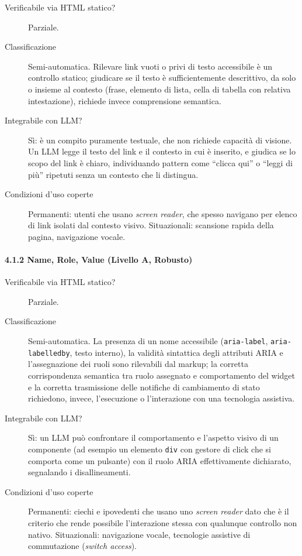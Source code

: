 \begin{description}

\item[Verificabile via HTML statico?] Parziale.

\item[Classificazione] Semi-automatica. Rilevare link vuoti o privi di testo accessibile è un controllo statico; giudicare se il testo è sufficientemente descrittivo, da solo o insieme al contesto (frase, elemento di lista, cella di tabella con relativa intestazione), richiede invece comprensione semantica.

\item[Integrabile con LLM?] Sì: è un compito puramente testuale, che non richiede capacità di visione. Un LLM legge il testo del link e il contesto in cui è inserito, e giudica se lo scopo del link è chiaro, individuando pattern come \enquote{clicca qui} o \enquote{leggi di più} ripetuti senza un contesto che li distingua.

\item[Condizioni d'uso coperte] Permanenti: utenti che usano \emph{screen reader}, che spesso navigano per elenco di link isolati dal contesto visivo. Situazionali: scansione rapida della pagina, navigazione vocale.

\end{description}

\paragraph*{4.1.2 Name, Role, Value (Livello A, Robusto)}

\begin{description}

\item[Verificabile via HTML statico?] Parziale.

\item[Classificazione] Semi-automatica. La presenza di un nome accessibile (\texttt{aria-label}, \texttt{aria-labelledby}, testo interno), la validità sintattica degli attributi ARIA e l'assegnazione dei ruoli sono rilevabili dal markup; la corretta corrispondenza semantica tra ruolo assegnato e comportamento del widget e la corretta trasmissione delle notifiche di cambiamento di stato richiedono, invece, l'esecuzione o l'interazione con una tecnologia assistiva.

\item[Integrabile con LLM?] Sì: un LLM può confrontare il comportamento e l'aspetto visivo di un componente (ad esempio un elemento \texttt{div} con gestore di click che si comporta come un pulsante) con il ruolo ARIA effettivamente dichiarato, segnalando i disallineamenti.

\item[Condizioni d'uso coperte] Permanenti: ciechi e ipovedenti che usano uno \emph{screen reader} dato che è il criterio che rende possibile l'interazione stessa con qualunque controllo non nativo. Situazionali: navigazione vocale, tecnologie assistive di commutazione (\emph{switch access}).

\end{description}

